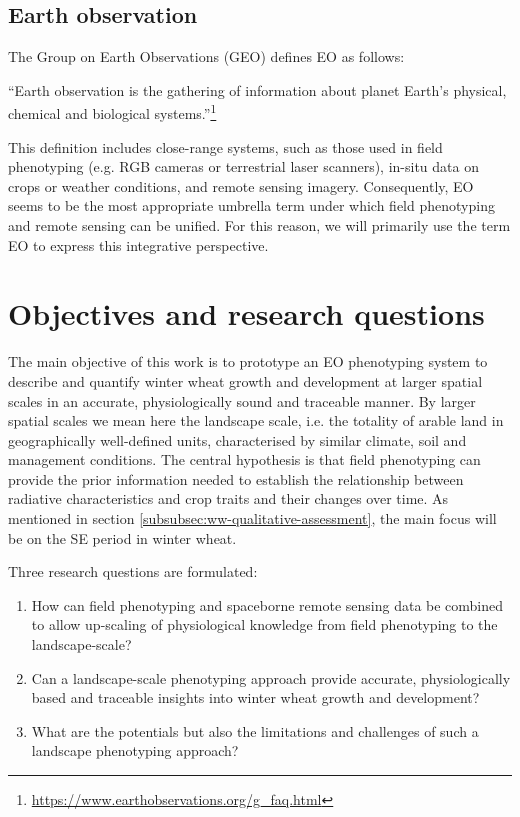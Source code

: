 \subsection{Earth observation}
\label{subsubsec:intro-eo}
The Group on Earth Observations (GEO) defines \gls{EO} as follows:
\begin{displayquote}
``Earth observation is the gathering of information about planet Earth's physical, chemical and biological systems.''\footnote{\url{https://www.earthobservations.org/g_faq.html}}
\end{displayquote}
This definition includes close-range systems, such as those used in field phenotyping (e.g. RGB cameras or terrestrial laser scanners), in-situ data on crops or weather conditions, and remote sensing imagery.
Consequently, \gls{EO} seems to be the most appropriate umbrella term under which field phenotyping and remote sensing can be unified. For this reason, we will primarily use the term \gls{EO} to express this integrative perspective.

\section{Objectives and research questions}
\label{sec:intro-obj-rj}
The main objective of this work is to prototype an \gls{EO} phenotyping system to describe and quantify winter wheat growth and development at larger spatial scales in an accurate, physiologically sound and traceable manner. By larger spatial scales we mean here the landscape scale, i.e. the totality of arable land in geographically well-defined units, characterised by similar climate, soil and management conditions. The central hypothesis is that field phenotyping can provide the prior information needed to establish the relationship between radiative characteristics and crop traits and their changes over time. As mentioned in section \ref{subsubsec:ww-qualitative-assessment}, the main focus will be on the \gls{SE} period in winter wheat.

Three research questions are formulated:

\begin{enumerate}
    \item How can field phenotyping and spaceborne remote sensing data be combined to allow up-scaling of physiological knowledge from field phenotyping to the landscape-scale?
    \item Can a landscape-scale phenotyping approach provide accurate, physiologically based and traceable insights into winter wheat growth and development?
    \item What are the potentials but also the limitations and challenges of such a landscape phenotyping approach?
\end{enumerate}


